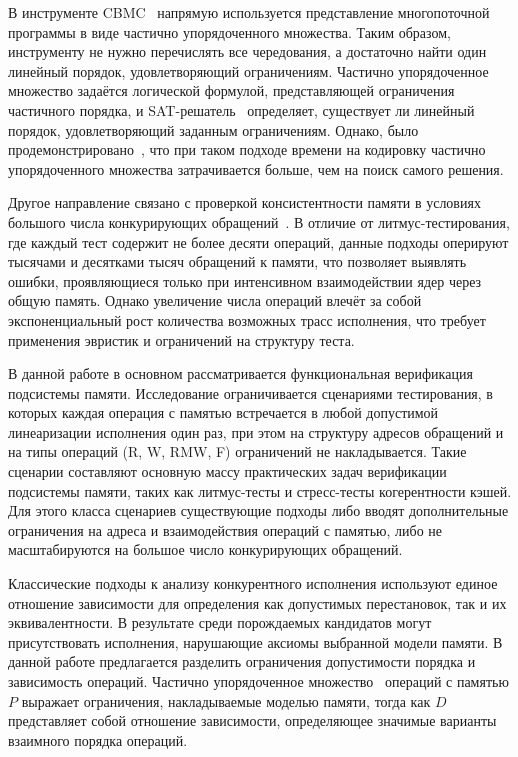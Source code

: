 В инструменте CBMC~\cite{alglave2013partial} напрямую используется
представление многопоточной программы в виде частично упорядоченного
множества. Таким образом, инструменту не нужно перечислять все
чередования, а достаточно найти один линейный порядок,
удовлетворяющий ограничениям.
Частично упорядоченное множество задаётся логической формулой,
представляющей ограничения частичного порядка, и
SAT-решатель~\cite{de2008z3} определяет, существует ли линейный
порядок, удовлетворяющий заданным ограничениям.
Однако, было продемонстрировано~\cite{horn2015automated}, что при
таком подходе времени на кодировку частично упорядоченного множества
затрачивается больше, чем на поиск самого решения.

Другое направление связано с проверкой консистентности памяти в
условиях большого числа конкурирующих
обращений~\cite{manovit, Axe}. В отличие от литмус-тестирования,
где каждый тест содержит не более десяти операций, данные подходы
оперируют тысячами и десятками тысяч обращений к памяти, что
позволяет выявлять ошибки, проявляющиеся только при интенсивном
взаимодействии ядер через общую память. Однако увеличение числа
операций влечёт за собой экспоненциальный рост количества возможных
трасс исполнения, что требует применения эвристик и ограничений на
структуру теста.

В данной работе в основном рассматривается функциональная верификация
подсистемы памяти. Исследование ограничивается сценариями тестирования, в
которых каждая
операция с памятью встречается в
любой допустимой линеаризации исполнения один раз, при этом на структуру
адресов обращений и на типы операций (R, W, RMW, F) ограничений не
накладывается. Такие сценарии составляют основную массу практических
задач верификации подсистемы памяти, таких как литмус-тесты и
стресс-тесты когерентности кэшей. Для этого класса сценариев
существующие подходы либо вводят дополнительные ограничения
на адреса и взаимодействия операций с памятью, либо не масштабируются
на большое число конкурирующих обращений.

Классические подходы к анализу конкурентного исполнения
используют единое отношение зависимости для определения как
допустимых перестановок, так и их эквивалентности.
В результате среди порождаемых кандидатов могут присутствовать
исполнения, нарушающие аксиомы выбранной модели памяти.
В данной работе предлагается разделить ограничения допустимости
порядка и зависимость операций.
Частично упорядоченное множество~\cite{poset}
операций с памятью $P$ выражает ограничения, накладываемые моделью памяти,
тогда как $D$ представляет собой отношение зависимости,
определяющее значимые варианты взаимного порядка операций.

